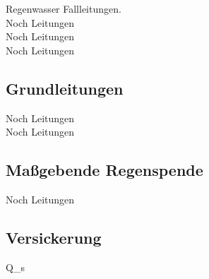 \documentclass[12pt]{report}
\begin{document}
Regenwasser Fallleitungen.\\
Noch Leitungen\\
Noch Leitungen\\
Noch Leitungen\\

\subsection*{Grundleitungen}

Noch Leitungen\\
Noch Leitungen\\

\subsection*{Maßgebende Regenspende}

Noch Leitungen\\

\subsection*{Versickerung}


Q_s
 




\end{document}
